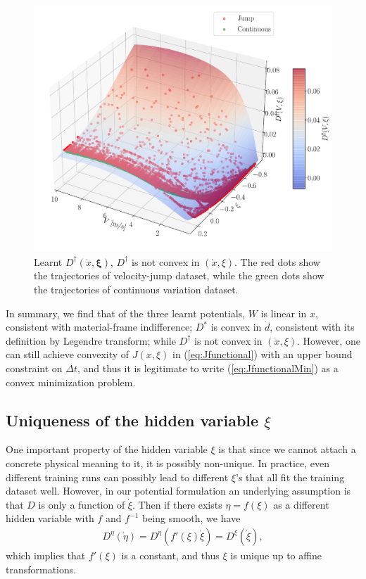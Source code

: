 \begin{figure}[htbp]
    \centering
    \includegraphics[height=0.5\textheight]{figures/Trial0216_combined_800_D_dagger_normal.pdf}
    \caption{Learnt $D^\dagger(\dot{x}, \bm{\xi})$, 
    $D^\dagger$ is not convex in $(\dot{x}, \xi)$.
    The red dots show the trajectories of velocity-jump dataset, 
    while the green dots show the trajectories of continuous variation dataset.}
    \label{fig:Ddagger}
\end{figure}

In summary, 
we find that of the three learnt potentials, 
$W$ is linear in $x$, 
consistent with material-frame indifference; 
$D^*$ is convex in $\dot{d}$, 
consistent with its definition by Legendre transform; 
while $D^\dagger$ is not convex in $(\dot{x}, \xi)$. 
However, 
one can still achieve convexity of $J(x, \xi)$ in (\ref{eq:Jfunctional}) with an upper bound constraint on $\Delta t$, 
and thus it is legitimate to write (\ref{eq:JfunctionalMin}) as a convex minimization problem. 

\subsection{Uniqueness of the hidden variable $\xi$}
One important property of the hidden variable $\xi$ is that since we cannot attach a concrete physical meaning to it, 
it is possibly non-unique. 
In practice, 
even different training runs can possibly lead to different $\xi$'s that all fit the training dataset well. 
However, 
in our potential formulation an underlying assumption is that $D$ is only a function of $\dot{\xi}$. 
Then if there exists $\eta = f(\xi)$ as a different hidden variable with $f$ and $f^{-1}$ being smooth, 
we have 
\begin{align}
    D^\eta\left(\dot{\eta}\right) = D^\eta\left(f'(\xi)\dot{\xi}\right) = D^\xi \left(\dot{\xi}\right) \label{eq:uniqueXi}, 
\end{align}
which implies that $f'(\xi)$ is a constant, 
and thus $\xi$ is unique up to affine transformations. 

